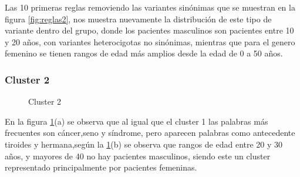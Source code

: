 Las 10 primeras reglas removiendo las variantes sinónimas que se muestran en la figura  \ref{fig:reglas2}, nos muestra nuevamente la distribución de este tipo de variante dentro del grupo, donde los pacientes masculinos son pacientes entre 10 y 20 años, con variantes heterocigotas no sinónimas, mientras que para el genero femenino se tienen rangos de edad más amplios desde la edad  de 0 a 50 años.

\subsubsection*{Cluster 2}

\begin{figure}[H]
	\centering
	\caption{Cluster 2} \label{fig:c2}
\end{figure}

En la figura \ref{fig:c2}(a) se observa que al igual que el cluster 1 las palabras más frecuentes son cáncer,seno y síndrome, pero aparecen palabras como antecedente tiroides y hermana,según la \ref{fig:c2}(b) se observa que rangos de edad entre 20 y 30 años, y mayores de 40 no hay pacientes masculinos, siendo este un cluster representado principalmente por pacientes femeninas.  

